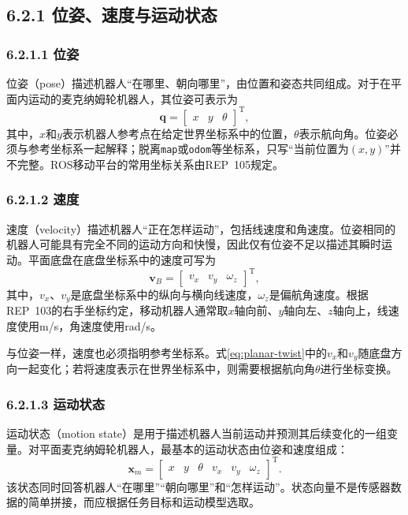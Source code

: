 \documentclass[UTF8,zihao=-4]{ctexart}
\newcommand{\vect}[1]{\bm{#1}}
\begin{document}
\subsection*{6.2.1 位姿、速度与运动状态}

\subsubsection*{6.2.1.1 位姿}

位姿（pose）描述机器人“在哪里、朝向哪里”，由位置和姿态共同组成。对于在平面内运动的麦克纳姆轮机器人，其位姿可表示为
\begin{equation}
  \vect{q}=
  \begin{bmatrix}
    x & y & \theta
  \end{bmatrix}^{\mathrm T},
  \label{eq:planar-pose}
\end{equation}
其中，$x$和$y$表示机器人参考点在给定世界坐标系中的位置，$\theta$表示航向角。位姿必须与参考坐标系一起解释；脱离\texttt{map}或\texttt{odom}等坐标系，只写“当前位置为$(x,y)$”并不完整。ROS移动平台的常用坐标关系由REP~105规定\cite{rep105}。

\subsubsection*{6.2.1.2 速度}

速度（velocity）描述机器人“正在怎样运动”，包括线速度和角速度。位姿相同的机器人可能具有完全不同的运动方向和快慢，因此仅有位姿不足以描述其瞬时运动。平面底盘在底盘坐标系中的速度可写为
\begin{equation}
  \vect{v}_B=
  \begin{bmatrix}
    v_x & v_y & \omega_z
  \end{bmatrix}^{\mathrm T},
  \label{eq:planar-twist}
\end{equation}
其中，$v_x$、$v_y$是底盘坐标系中的纵向与横向线速度，$\omega_z$是偏航角速度。根据REP~103的右手坐标约定，移动机器人通常取$x$轴向前、$y$轴向左、$z$轴向上，线速度使用\si{m/s}，角速度使用\si{rad/s}\cite{rep103}。

与位姿一样，速度也必须指明参考坐标系。式\eqref{eq:planar-twist}中的$v_x$和$v_y$随底盘方向一起变化；若将速度表示在世界坐标系中，则需要根据航向角$\theta$进行坐标变换。

\subsubsection*{6.2.1.3 运动状态}

运动状态（motion state）是用于描述机器人当前运动并预测其后续变化的一组变量。对平面麦克纳姆轮机器人，最基本的运动状态由位姿和速度组成：
\begin{equation}
  \vect{x}_{m}=
  \begin{bmatrix}
    x & y & \theta & v_x & v_y & \omega_z
  \end{bmatrix}^{\mathrm T}.
  \label{eq:teaching-state}
\end{equation}
该状态同时回答机器人“在哪里”“朝向哪里”和“怎样运动”。状态向量不是传感器数据的简单拼接，而应根据任务目标和运动模型选取。
\end{document}
